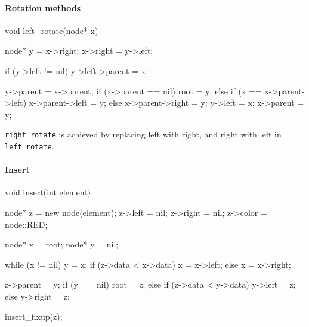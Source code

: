 \documentclass{report}
\begin{document}
\pagebreak 
\paragraph{Rotation methods}
\bigbreak \noindent \bigbreak \noindent 
\begin{cppcode}
    void left_rotate(node* x) {
        node* y = x->right;
        x->right = y->left;

        if (y->left != nil) {
            y->left->parent = x;
        }

        y->parent = x->parent;
        if (x->parent == nil) {
            root = y;
        } else if (x == x->parent->left) {
            x->parent->left = y;
        } else {
            x->parent->right = y;
        }
        y->left = x;
        x->parent = y;
    }
\end{cppcode}
\bigbreak \noindent 
\texttt{right\_rotate} is achieved by replacing left with right, and right with left in \texttt{left\_rotate}.

\pagebreak 
\paragraph{Insert}
\bigbreak \noindent \bigbreak \noindent 
\begin{cppcode}
    void insert(int element) {
        node* z = new node(element);
        z->left = nil;
        z->right = nil;
        z->color = node::RED;

        node* x = root;
        node* y = nil;

        while (x != nil) {
            y = x;
            if (z->data < x->data) {
                x = x->left;
            } else {
                x = x->right;
            }
        }

        z->parent = y;
        if (y == nil) {
            root = z;
        } else if (z->data < y->data) {
            y->left = z;
        } else {
            y->right = z;
        }

        insert_fixup(z);
    }
\end{cppcode}


\pagebreak 
\end{document}

